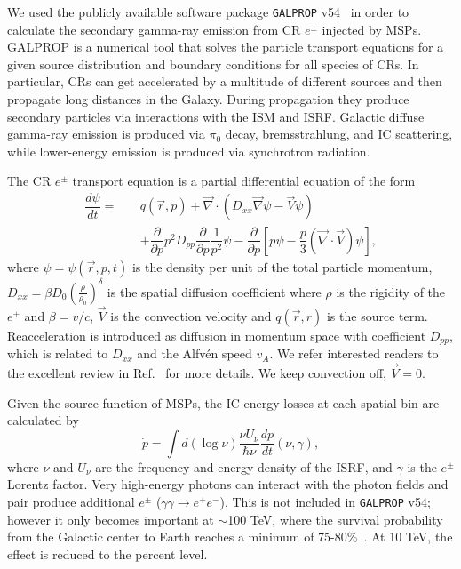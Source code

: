 \documentclass[%
reprint,
superscriptaddress,
amsmath,amssymb,
aps,
floatfix,
]{revtex4-1}
\begin{document}
We used the publicly available software package \texttt{GALPROP} v54~\cite{Galprop,Galpropsupplementary} in order to calculate the secondary gamma-ray emission from CR $e^\pm$ injected by MSPs. GALPROP is a numerical tool that solves the particle transport equations for a given source distribution and boundary conditions for all species of CRs. In particular, CRs can get accelerated by a multitude of different sources and then propagate long distances in the Galaxy. During propagation they produce secondary particles via interactions with the ISM and ISRF. Galactic diffuse gamma-ray emission is produced via $\pi_0$ decay, bremsstrahlung, and IC scattering, while lower-energy emission is produced via synchrotron radiation.

The CR $e^\pm$ transport equation is a partial differential equation of the form
\begin{eqnarray}
  \label{eq:prop_eq}
  \dfrac{d\psi}{dt} =\ &&q(\vec{r},p)+\vec{\nabla}\cdot(D_{xx}\vec{\nabla}\psi-\vec{V}\psi)\nonumber\\
                       &&+\dfrac{\partial}{\partial p}p^2D_{pp}\dfrac{\partial}{\partial p}\dfrac{1}{p^2}\psi-\dfrac{\partial}{\partial p}[\dot{p}\psi-\dfrac{p}{3}(\vec{\nabla}\cdot\vec{V})\psi],
\end{eqnarray}
where $\psi = \psi(\vec{r},p,t)$ is the density per unit of the total particle momentum, $D_{xx} = \beta D_0 (\frac{\rho}{\rho_0})^\delta$ is the spatial diffusion coefficient where $\rho$ is the rigidity of the $e^\pm$ and $\beta = v/c$, $\vec{V}$ is the convection velocity and $q(\vec{r},r)$ is the source term. Reacceleration is introduced as diffusion in momentum space with coefficient $D_{pp}$, which is related to $D_{xx}$ and the Alfv\'{e}n speed $v_A$. We refer interested readers to the excellent review in Ref.~\cite{Strong:2007nh} for more details. We keep convection off, $\vec{V}=0$.

Given the source function of MSPs, the IC energy losses at each spatial bin are calculated by
\begin{equation}
  \dot{p} = \int d(\log{\nu})\dfrac{\nu U_\nu}{\hbar \nu}\dfrac{dp}{dt}(\nu,\gamma),
\end{equation}
where $\nu$ and $U_\nu$ are the frequency and energy density of the ISRF, and $\gamma$ is the $e^\pm$ Lorentz factor. Very high-energy photons can interact with the photon fields and pair produce additional $e^\pm$ ($\gamma\gamma \to e^+e^-$). This is not included in \texttt{GALPROP} v54; however it only becomes important at $\sim$100 TeV, where the survival probability from the Galactic center to Earth reaches a minimum of 75-80\%~\cite{Moskalenko:2005ng}. At 10 TeV, the effect is reduced to the percent level.
\end{document}
